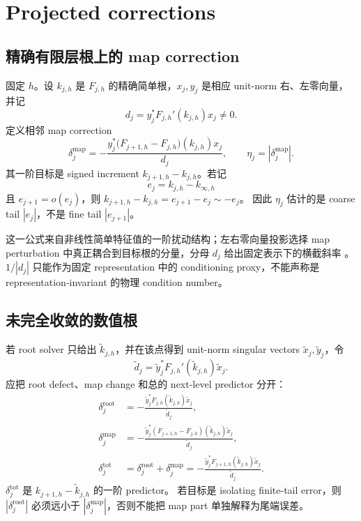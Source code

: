 \documentclass[UTF8,fontset=fandol,11pt,a4paper]{ctexart}
\begin{document}
\section{Projected corrections}

\subsection{精确有限层根上的 map correction}

固定 $h$。设 $k_{j,h}$ 是 $F_{j,h}$ 的精确简单根，$x_j,y_j$ 是相应 unit-norm
右、左零向量，并记
\[
  d_j=y_j^*F_{j,h}'(k_{j,h})x_j\ne0.
\]
定义相邻 map correction
\begin{equation}
  \delta_j^{\mathrm{map}}
  =-
  \frac{y_j^*\bigl(F_{j+1,h}-F_{j,h}\bigr)(k_{j,h})x_j}{d_j},
  \qquad
  \eta_j=|\delta_j^{\mathrm{map}}|.
  \label{eq:map-correction}
\end{equation}
其一阶目标是 signed increment $k_{j+1,h}-k_{j,h}$。若记
\[
  e_j=k_{j,h}-k_{\infty,h}
\]
且 $e_{j+1}=o(e_j)$，则 $k_{j+1,h}-k_{j,h}=e_{j+1}-e_j\sim-e_j$。
因此 $\eta_j$ 估计的是 coarse tail $|e_j|$，不是 fine tail $|e_{j+1}|$。

这一公式来自非线性简单特征值的一阶扰动结构；左右零向量投影选择 map perturbation
中真正耦合到目标根的分量，分母 $d_j$ 给出固定表示下的横截斜率
\cite{GuettelTisseur2017}。$1/|d_j|$ 只能作为固定 representation 中的 conditioning
proxy，不能声称是 representation-invariant 的物理 condition number。

\subsection{未完全收敛的数值根}

若 root solver 只给出 $\widetilde k_{j,h}$，并在该点得到 unit-norm singular vectors
$\widetilde x_j,\widetilde y_j$，令
\[
  \widetilde d_j
  =\widetilde y_j^*F_{j,h}'(\widetilde k_{j,h})\widetilde x_j.
\]
应把 root defect、map change 和总的 next-level predictor 分开：
\begin{align}
  \delta_j^{\mathrm{root}}
  &=-\frac{\widetilde y_j^*F_{j,h}(\widetilde k_{j,h})\widetilde x_j}
           {\widetilde d_j},\label{eq:root-correction}\\
  \delta_j^{\mathrm{map}}
  &=-\frac{\widetilde y_j^*
    (F_{j+1,h}-F_{j,h})(\widetilde k_{j,h})\widetilde x_j}
    {\widetilde d_j},\label{eq:computed-map-correction}\\
  \delta_j^{\mathrm{tot}}
  &=\delta_j^{\mathrm{root}}+\delta_j^{\mathrm{map}}
   =-\frac{\widetilde y_j^*F_{j+1,h}(\widetilde k_{j,h})\widetilde x_j}
            {\widetilde d_j}.\label{eq:total-correction}
\end{align}
$\delta_j^{\mathrm{tot}}$ 是 $k_{j+1,h}-\widetilde k_{j,h}$ 的一阶 predictor。
若目标是 isolating finite-tail error，则 $|\delta_j^{\mathrm{root}}|$ 必须远小于
$|\delta_j^{\mathrm{map}}|$，否则不能把 map part 单独解释为尾端误差。
\end{document}
